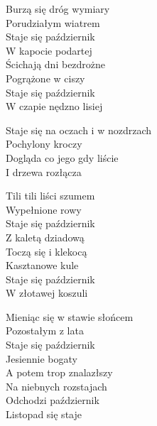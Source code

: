 \begin{textn}
    \chordfill
    Burzą się dróg wymiary\\
    Porudziałym wiatrem\\
    Staje się październik\\
    W kapocie podartej\\
    Ścichają dni bezdrożne\\
    Pogrążone w ciszy\\
    Staje się październik\\
    W czapie nędzno lisiej

    \vin Staje się na oczach i w nozdrzach\\
    \vin Pochylony kroczy\\
    \vin Dogląda co jego gdy liście\\
    \vin I drzewa rozłącza

    Tili tili liści szumem\\
    Wypełnione rowy\\
    Staje się październik\\
    Z kaletą dziadową\\
    Toczą się i klekocą\\
    Kasztanowe kule\\
    Staje się październik\\
    W złotawej koszuli

    Mieniąc się w stawie słońcem\\
    Pozostałym z lata\\
    Staje się październik\\
    Jesiennie bogaty\\
    A potem trop znalazłszy\\
    Na niebnych rozstajach\\
    Odchodzi październik\\
    Listopad się staje
\end{textn}
